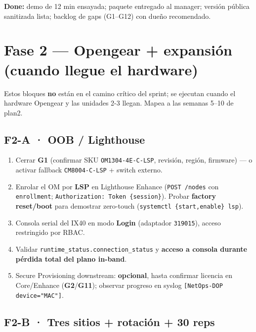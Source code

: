 \documentclass[11pt,a4paper]{article}
\newcommand{\file}[1]{\texttt{#1}}
\newcommand{\gate}[1]{\textbf{G#1}}
\newcommand{\done}{\textbf{Done:}}
\begin{document}
\begin{clave}
\small
\done{} demo de 12 min ensayada; paquete entregado al manager; versión pública sanitizada lista;
backlog de gaps (G1–G12) con dueño recomendado.
\end{clave}

\section{Fase 2 — Opengear + expansión (cuando llegue el hardware)}

\begin{nota}
\small
Estos bloques \textbf{no} están en el camino crítico del sprint; se ejecutan cuando el hardware
Opengear y las unidades 2-3 llegan. Mapea a las semanas 5–10 de plan2.
\end{nota}

\subsection{F2-A · OOB / Lighthouse}

\begin{enumerate}
  \item Cerrar \textbf{\gate{1}} (confirmar SKU \file{OM1304-4E-C-LSP}, revisión, región,
        firmware) — o activar fallback \file{CM8004-C-LSP} + switch externo.
  \item Enrolar el OM por \textbf{LSP} en Lighthouse Enhance
        (\file{POST /nodes} con \file{enrollment};
        \file{Authorization: Token \{session\}}).
        Probar \textbf{factory reset/boot} para demostrar zero-touch
        (\file{systemctl \{start,enable\} lsp}).
  \item Consola serial del IX40 en modo \textbf{Login} (adaptador \file{319015}), acceso
        restringido por RBAC.
  \item Validar \file{runtime\_status.connection\_status} y \textbf{acceso a consola durante
        pérdida total del plano in-band}.
  \item Secure Provisioning downstream: \textbf{opcional}, hasta confirmar licencia en
        Core/Enhance (\gate{2}/\gate{11}); observar progreso en syslog
        \file{[NetOps-DOP device="MAC"]}.
\end{enumerate}

\subsection{F2-B · Tres sitios + rotación + 30 reps}
\end{document}
